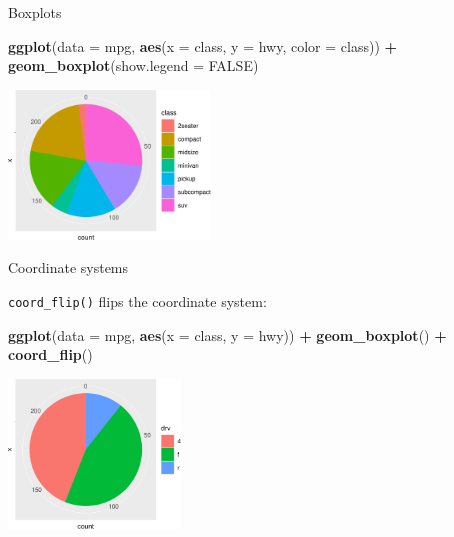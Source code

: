 \documentclass[ignorenonframetext,]{beamer}
\newenvironment{Shaded}{\begin{snugshade}}{\end{snugshade}}
\newcommand{\DataTypeTok}[1]{\textcolor[rgb]{0.13,0.29,0.53}{#1}}
\newcommand{\KeywordTok}[1]{\textcolor[rgb]{0.13,0.29,0.53}{\textbf{#1}}}
\newcommand{\NormalTok}[1]{#1}
\newcommand{\OperatorTok}[1]{\textcolor[rgb]{0.81,0.36,0.00}{\textbf{#1}}}
\newcommand{\OtherTok}[1]{\textcolor[rgb]{0.56,0.35,0.01}{#1}}
\newcommand{\StringTok}[1]{\textcolor[rgb]{0.31,0.60,0.02}{#1}}
\begin{document}
\begin{frame}[fragile]{Boxplots}
\protect\hypertarget{boxplots-5}{}

\begin{Shaded}
\begin{Highlighting}[]
\KeywordTok{ggplot}\NormalTok{(}\DataTypeTok{data =}\NormalTok{ mpg, }
       \KeywordTok{aes}\NormalTok{(}\DataTypeTok{x =}\NormalTok{ class, }\DataTypeTok{y =}\NormalTok{ hwy, }\DataTypeTok{color =}\NormalTok{ class)) }\OperatorTok{+}\StringTok{ }
\StringTok{  }\KeywordTok{geom_boxplot}\NormalTok{(}\DataTypeTok{show.legend =} \OtherTok{FALSE}\NormalTok{)}
\end{Highlighting}
\end{Shaded}

\begin{center}\includegraphics[height=150px]{data-visualization_files/figure-beamer/unnamed-chunk-144-1} \end{center}

\end{frame}

\begin{frame}[fragile]{Coordinate systems}
\protect\hypertarget{coordinate-systems}{}

\texttt{coord\_flip()} flips the coordinate system:

\begin{Shaded}
\begin{Highlighting}[]
\KeywordTok{ggplot}\NormalTok{(}\DataTypeTok{data =}\NormalTok{ mpg, }\KeywordTok{aes}\NormalTok{(}\DataTypeTok{x =}\NormalTok{ class, }\DataTypeTok{y =}\NormalTok{ hwy)) }\OperatorTok{+}\StringTok{ }
\StringTok{  }\KeywordTok{geom_boxplot}\NormalTok{() }\OperatorTok{+}
\StringTok{  }\KeywordTok{coord_flip}\NormalTok{()}
\end{Highlighting}
\end{Shaded}

\begin{center}\includegraphics[height=150px]{data-visualization_files/figure-beamer/unnamed-chunk-145-1} \end{center}

\end{frame}
\end{document}
